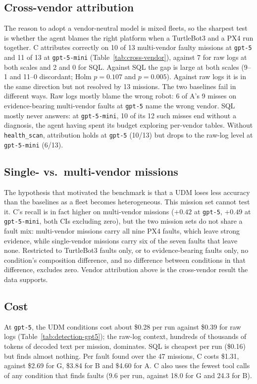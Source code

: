 \documentclass[conference]{IEEEtran}
\newcommand{\condA}{A}
\newcommand{\condB}{B}
\newcommand{\condC}{C}
\newcommand{\condG}{G}
\newcommand{\hs}{\texttt{health\_scan}}
\begin{document}



\subsection{Cross-vendor attribution}
The reason to adopt a vendor-neutral model is mixed fleets, so the sharpest test is
whether the agent blames the right platform when a TurtleBot3 and a PX4 run
together. \condC{} attributes correctly on 10 of 13 multi-vendor faulty missions at
\texttt{gpt-5} and 11 of 13 at \texttt{gpt-5-mini}
(Table~\ref{tab:cross-vendor}), against 7 for raw logs at both scales and 2 and 0
for SQL. Against SQL the gap is large at both scales (9--1 and 11--0 discordant;
Holm $p=0.107$ and $p=0.005$). Against raw logs it is in the same direction but not
resolved by 13 missions. The two baselines fail in different ways. Raw logs mostly
blame the wrong robot: 6 of \condA{}'s 9 misses on evidence-bearing multi-vendor
faults at \texttt{gpt-5} name the wrong vendor. SQL mostly never answers: at
\texttt{gpt-5-mini}, 10 of its 12 such misses end without a diagnosis, the agent
having spent its budget exploring per-vendor tables. Without \hs{}, attribution
holds at \texttt{gpt-5} (10/13) but drops to the raw-log level at
\texttt{gpt-5-mini} (6/13).

\subsection{Single- vs.\ multi-vendor missions}
The hypothesis that motivated the benchmark is that a UDM loses less accuracy than
the baselines as a fleet becomes heterogeneous. This mission set cannot test it.
\condC{}'s recall is in fact higher on multi-vendor missions ($+0.42$ at
\texttt{gpt-5}, $+0.49$ at \texttt{gpt-5-mini}, both CIs excluding zero), but the
two mission sets do not share a fault mix: multi-vendor missions carry all nine PX4
faults, which leave strong evidence, while single-vendor missions carry six of the
seven faults that leave none. Restricted to TurtleBot3 faults only, or to
evidence-bearing faults only, no condition's composition difference, and no
difference between conditions in that difference, excludes zero. Vendor attribution
above is the cross-vendor result the data supports.

\subsection{Cost}
At \texttt{gpt-5}, the UDM conditions cost about \$0.28 per run against \$0.39 for
raw logs (Table~\ref{tab:detection-gpt5}); the raw-log context, hundreds of
thousands of tokens of decoded text per mission, dominates. SQL is cheapest per run
(\$0.16) but finds almost nothing. Per fault found over the 47 missions, \condC{}
costs \$1.31, against \$2.69 for \condG, \$3.84 for \condB{} and \$4.60 for
\condA. \condC{} also uses the fewest tool calls of any condition that finds faults
(9.6 per run, against 18.0 for \condG{} and 24.3 for \condB).
\end{document}

